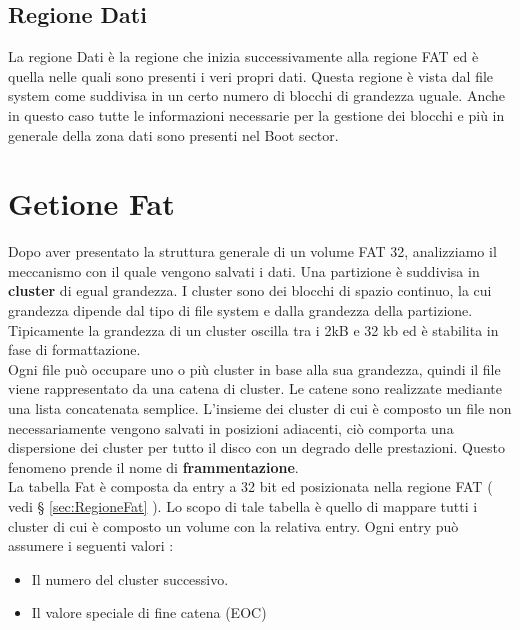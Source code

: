     \subsection{Regione Dati}
	      La regione Dati è la regione che inizia successivamente alla regione FAT ed è quella nelle quali sono presenti i veri propri dati. 
	      Questa regione è vista dal file system come suddivisa in un certo numero di blocchi di grandezza uguale. Anche in questo caso tutte le informazioni necessarie per la gestione dei blocchi e più in generale della zona dati sono presenti nel Boot sector.
    \section{Getione Fat}
    \label{GestioneFat}
        Dopo aver presentato la struttura generale di un volume FAT 32, analizziamo il meccanismo con il quale vengono salvati i dati. 
	Una partizione è suddivisa in \textbf{cluster} di egual grandezza. I cluster sono dei blocchi di spazio continuo, la cui grandezza dipende dal tipo di file system e dalla grandezza della partizione. 
       Tipicamente la grandezza di un cluster oscilla tra i 2kB e 32 kb ed è stabilita in fase di formattazione.\\
        Ogni file può occupare uno o più cluster in base alla sua grandezza, quindi il file viene rappresentato da una catena di cluster. Le catene sono realizzate mediante una lista concatenata semplice.
        L'insieme dei cluster di cui è composto un file non necessariamente vengono salvati in posizioni adiacenti, ciò comporta una dispersione dei cluster per tutto il disco con un degrado delle prestazioni. 
	Questo fenomeno prende il nome di \textbf{frammentazione}.\\
	La tabella Fat è composta da entry a 32 bit ed posizionata nella regione FAT ( vedi § \ref{sec:RegioneFat} ). Lo scopo di tale tabella è quello di mappare tutti i cluster di cui è composto un volume con la relativa entry. 
	Ogni entry può assumere i seguenti valori : 

	  \begin{itemize}
	   \item Il numero del cluster successivo.
	  \end{itemize}

	  \begin{itemize}
	   \item Il valore speciale di fine catena (EOC)
	  \end{itemize}

